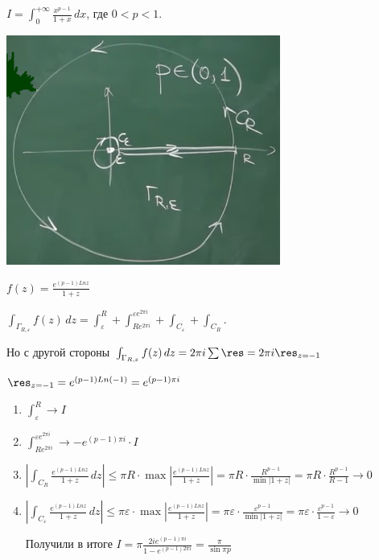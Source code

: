 \begin{example}
    $I = \int_{0}^{+\infty} \frac{x^{p - 1}}{1 + x} \, dx $, где $0 < p < 1$.
    
    \begin{center}
        \includegraphics[width=9cm]{assets/04-functions-of-complex-variables/example-2-principal-value-integral.png}
    \end{center}

    $f(z) = \frac{e^{(p - 1) Ln z}}{1 + z}$

    $\int_{\Gamma_{R, \varepsilon}} f(z) \, dz = \int_{\varepsilon}^{R} + \int_{Re^{2\pi i}}^{\varepsilon e^{2\pi i}} + \int_{C_{\varepsilon}} + \int_{C_R}$.

    Но с другой стороны $\int_{\Gamma_{R, \varepsilon}} f(z) \, dz = 2 \pi i \sum \res = 2 \pi i \res_{z = -1}$

    $\res_{z = -1} = e^{(p - 1) Ln (-1)} = e^{(p - 1)\pi i}$

    \begin{enumerate}
        \item $\int_{\varepsilon}^{R} \rightarrow I$
        \item $\int_{Re^{2\pi i}}^{\varepsilon e^{2 \pi i}} \rightarrow -e^{(p - 1) \pi i} \cdot I$
        \item {
            $\left | \int_{C_{R}} \frac{e^{(p - 1)Ln z}}{1 + z} \, dz \right | \leqslant \pi R \cdot \max \left | \frac{e^{(p - 1) Ln z}}{1 + z} \right | = 
            \pi R \cdot \frac{R^{p - 1}}{\min |1 + z|} = \pi R \cdot \frac{R^{p - 1}}{R - 1} \rightarrow 0$

        }
        \item {
            $\left | \int_{C_{\varepsilon}} \frac{e^{(p - 1)Ln z}}{1 + z} \, dz \right | \leqslant \pi \varepsilon \cdot \max \left | \frac{e^{(p - 1) Ln z}}{1 + z} \right | = 
            \pi \varepsilon \cdot \frac{\varepsilon^{p - 1}}{\min |1 + z|} = \pi \varepsilon \cdot \frac{\varepsilon^{p - 1}}{1 - \varepsilon} \rightarrow 0$
        }

        Получили в итоге $I = \pi \frac{2i e^{(p - 1)\pi i}}{1 - e^{(p - 1)2\pi i}} = \frac{\pi}{\sin \pi p}$
    \end{enumerate}
\end{example}

